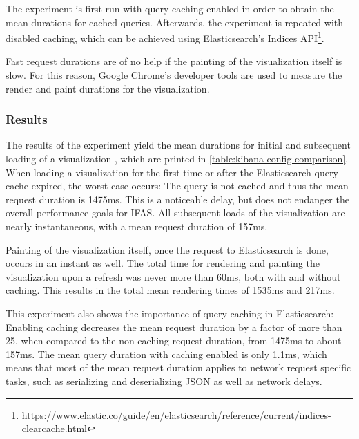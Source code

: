 The experiment is first run with query caching enabled in order to obtain the mean durations for cached queries.
Afterwards, the experiment is repeated with disabled caching, which can be achieved using Elasticsearch's Indices API\footnote{\url{https://www.elastic.co/guide/en/elasticsearch/reference/current/indices-clearcache.html}}.

Fast request durations are of no help if the painting of the visualization itself is slow.
For this reason, Google Chrome's developer tools are used to measure the render and paint durations for the visualization.

\subsubsection{Results}

The results of the experiment yield the mean durations for initial and subsequent loading of a visualization , which are printed in \cref{table:kibana-config-comparison}.
When loading a visualization for the first time or after the Elasticsearch query cache expired, the worst case occurs: The query is not cached and thus the mean request duration is 1475ms.
This is a noticeable delay, but does not endanger the overall performance goals for \ac{IFAS}.
All subsequent loads of the visualization are nearly instantaneous, with a mean request duration of 157ms.

Painting of the visualization itself, once the request to Elasticsearch is done, occurs in an instant as well.
The total time for rendering and painting the visualization upon a refresh was never more than 60ms, both with and without caching.
This results in the total mean rendering times of 1535ms and 217ms.

This experiment also shows the importance of query caching in Elasticsearch:
Enabling caching decreases the mean request duration by a factor of more than 25, when compared to the non-caching request duration, from 1475ms to about 157ms.
The mean query duration with caching enabled is only 1.1ms, which means that most of the mean request duration applies to network request specific tasks, such as serializing and deserializing JSON as well as network delays.

